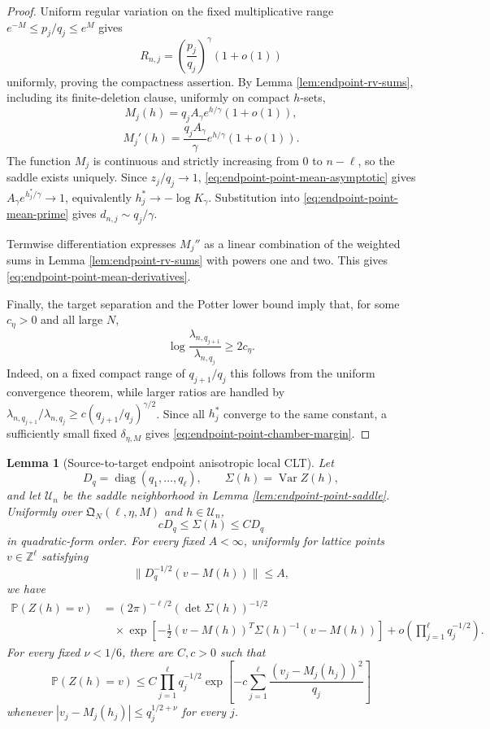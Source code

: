 \documentclass[11pt]{article}
\newtheorem{lemma}[theorem]{Lemma}
\theoremstyle{remark}
\newcommand{\Pp}{\mathbb P}
\newcommand{\Var}{\operatorname{Var}}
\newcommand{\diag}{\operatorname{diag}}
\begin{document}
\begin{proof}
Uniform regular variation on the fixed multiplicative range
$e^{-M}\le p_j/q_j\le e^M$ gives
\[
        R_{n,j}
        =\left(\frac{p_j}{q_j}\right)^\gamma(1+o(1))
\tag{10.7}\label{eq:endpoint-point-rate-ratio}
\]
uniformly, proving the compactness assertion.  By Lemma
\ref{lem:endpoint-rv-sums}, including its finite-deletion clause, uniformly on
compact $h$-sets,
\[
        M_j(h)=q_jA_\gamma e^{h/\gamma}(1+o(1)),
\tag{10.8}\label{eq:endpoint-point-mean-asymptotic}
\]
\[
        M_j'(h)=\frac{q_jA_\gamma}{\gamma}
        e^{h/\gamma}(1+o(1)).
\tag{10.9}\label{eq:endpoint-point-mean-prime}
\]
The function $M_j$ is continuous and strictly increasing from $0$ to
$n-\ell$, so the saddle exists uniquely.  Since $z_j/q_j\to1$,
\eqref{eq:endpoint-point-mean-asymptotic} gives
$A_\gamma e^{h_j^*/\gamma}\to1$, equivalently
$h_j^*\to-\log K_\gamma$.  Substitution into
\eqref{eq:endpoint-point-mean-prime} gives
$d_{n,j}\sim q_j/\gamma$.

Termwise differentiation expresses $M_j''$ as a linear combination of the
weighted sums in Lemma \ref{lem:endpoint-rv-sums} with powers one and two.
This gives \eqref{eq:endpoint-point-mean-derivatives}.

Finally, the target separation and the Potter lower bound imply that, for some
$c_\eta>0$ and all large $N$,
\[
        \log\frac{\lambda_{n,q_{j+1}}}{\lambda_{n,q_j}}
        \ge2c_\eta.
\tag{10.10}\label{eq:endpoint-point-rate-gap}
\]
Indeed, on a fixed compact range of $q_{j+1}/q_j$ this follows from the uniform
convergence theorem, while larger ratios are handled by
$\lambda_{n,q_{j+1}}/\lambda_{n,q_j}
 \ge c(q_{j+1}/q_j)^{\gamma/2}$.
Since all $h_j^*$ converge to the same constant, a sufficiently small fixed
$\delta_{\eta,M}$ gives \eqref{eq:endpoint-point-chamber-margin}.
\end{proof}

\begin{lemma}[Source-to-target endpoint anisotropic local CLT]
\label{lem:endpoint-point-llt}
Let
\[
        D_q=\diag(q_1,\ldots,q_\ell),
        \qquad
        \Sigma(h)=\Var Z(h),
\]
and let $\mathcal U_n$ be the saddle neighborhood in Lemma
\ref{lem:endpoint-point-saddle}.  Uniformly over
$\mathfrak Q_N(\ell,\eta,M)$ and $h\in\mathcal U_n$,
\[
        cD_q\le\Sigma(h)\le CD_q
\tag{10.11}\label{eq:endpoint-point-covariance-comparison}
\]
in quadratic-form order.  For every fixed $A<\infty$, uniformly for lattice
points $v\in\mathbb Z^\ell$ satisfying
\[
        \|D_q^{-1/2}(v-M(h))\|\le A,
\]
we have
\[
\begin{aligned}
\Pp(Z(h)=v)
&=(2\pi)^{-\ell/2}(\det\Sigma(h))^{-1/2}\\
&\quad\times
\exp\left[-\frac12(v-M(h))^T\Sigma(h)^{-1}(v-M(h))\right]
+o\left(\prod_{j=1}^\ell q_j^{-1/2}\right).
\end{aligned}
\tag{10.12}\label{eq:endpoint-point-llt}
\]
For every fixed $\nu<1/6$, there are $C,c>0$ such that
\[
\Pp(Z(h)=v)
\le C\prod_{j=1}^\ell q_j^{-1/2}
\exp\left[-c\sum_{j=1}^\ell
\frac{(v_j-M_j(h_j))^2}{q_j}\right]
\tag{10.13}\label{eq:endpoint-point-local-upper}
\]
whenever
$|v_j-M_j(h_j)|\le q_j^{1/2+\nu}$ for every $j$.
\end{lemma}
\end{document}
